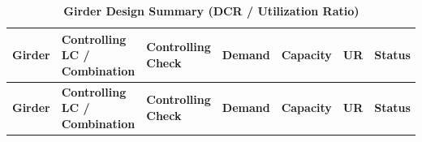 \documentclass[12pt,a4paper]{report}
\numberwithin{table}{chapter}
\numberwithin{figure}{chapter}
\newcommand{\ReportTableRowGap}{6pt}
\begin{document}
\vspace{1em}
\vspace{0.4em}
\begin{longtable}{|C{1.6cm}|>{\centering\arraybackslash}p{3.6cm}|C{2.4cm}|C{2.0cm}|C{2.1cm}|C{1.7cm}|C{1.5cm}|}
\caption{\textbf{Girder Design Summary (DCR / Utilization Ratio)}}\\
\hline
\textbf{Girder} & \textbf{Controlling LC / Combination} & \textbf{Controlling Check} & \textbf{Demand} & \textbf{Capacity} & \textbf{UR} & \textbf{Status} \\[\ReportTableRowGap]
\hline
\endfirsthead
\hline
\textbf{Girder} & \textbf{Controlling LC / Combination} & \textbf{Controlling Check} & \textbf{Demand} & \textbf{Capacity} & \textbf{UR} & \textbf{Status} \\[\ReportTableRowGap]
\hline
\endhead


\end{longtable}
\end{document}
